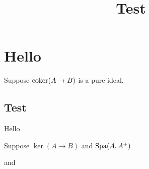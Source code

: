 

\title{Test}


	\maketitle
	
	\section{Hello}
	
	Suppose $\operatorname{coker}(A \to B)$ is a pure ideal.
	
	\subsection{Test}
	
	Hello
	
	\begin{lemma} \label{hello}
		Suppose $\ker(A \to B)$ and $\operatorname{Spa}(A, A^+)$ 
	\end{lemma}

	 and 
	
